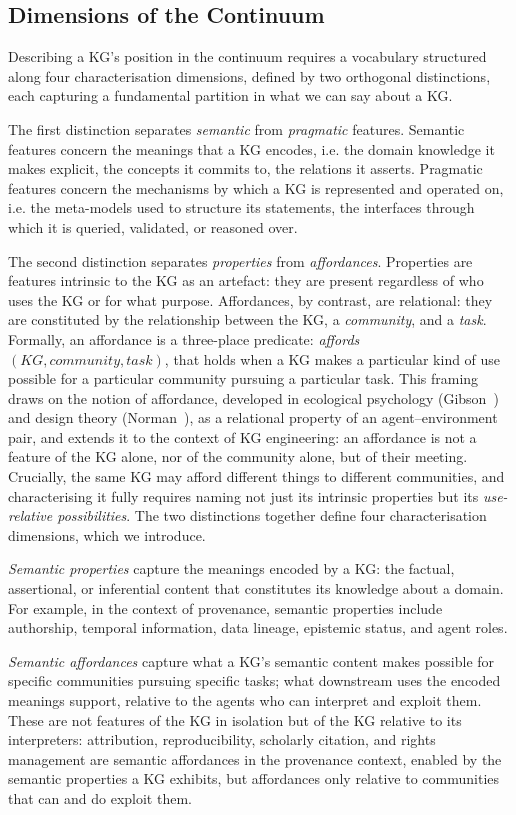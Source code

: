 \documentclass[runningheads]{llncs}
\newenvironment{onlyextended}{\ignorespaces}{\ignorespacesafterend}
\begin{document}
\begin{onlyextended}
\subsection{Dimensions of the Continuum}
Describing a KG's position in the continuum requires a vocabulary structured along four characterisation dimensions, defined by two orthogonal distinctions, each capturing a fundamental partition in what we can say about a KG.

The first distinction separates \emph{semantic} from \emph{pragmatic} features. 
Semantic features concern the meanings that a KG encodes, i.e. the domain knowledge it makes explicit, the concepts it commits to, the relations it asserts. 
Pragmatic features concern the mechanisms by which a KG is represented and operated on, i.e. the meta-models used to structure its statements, the interfaces through which it is queried, validated, or reasoned over.

The second distinction separates \textit{properties} from \textit{affordances}. 
Properties are features intrinsic to the KG as an artefact: they are present regardless of who uses the KG or for what purpose. 
Affordances, by contrast, are relational: they are constituted by the relationship between the KG, a \textit{community}, and a \textit{task}. 
Formally, an affordance is a three-place predicate: \textit{affords}$(KG, community, task)$, that holds when a KG makes a particular kind of use possible for a particular community pursuing a particular task. 
This framing draws on the notion of affordance, developed in ecological psychology (Gibson~\cite{gibson1977theory}) and design theory (Norman~\cite{norman1999affordance}), as a relational property of an agent–environment pair, and extends it to the context of KG engineering: an affordance is not a feature of the KG alone, nor of the community alone, but of their meeting. 
Crucially, the same KG may afford different things to different communities, and characterising it fully requires naming not just its intrinsic properties but its \textit{use-relative possibilities}.
The two distinctions together define four characterisation dimensions, which we introduce.

\emph{Semantic properties} capture the meanings encoded by a KG: the factual, assertional, or inferential content that constitutes its knowledge about a domain. 
For example, in the context of provenance, semantic properties include authorship, temporal information, data lineage, epistemic status, and agent roles.

\emph{Semantic affordances} capture what a KG's semantic content makes possible for specific communities pursuing specific tasks; what downstream uses the encoded meanings support, relative to the agents who can interpret and exploit them. 
These are not features of the KG in isolation but of the KG relative to its interpreters: attribution, reproducibility, scholarly citation, and rights management are semantic affordances in the provenance context, enabled by the semantic properties a KG exhibits, but affordances only relative to communities that can and do exploit them.


\end{onlyextended}
\end{document}
